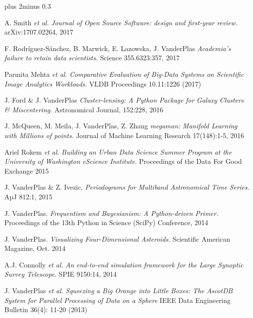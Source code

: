 \documentclass{article} %
\def\bf{\bfseries}
\def\sf{\sffamily}
\newlength\sidebarwidth
\newcommand{\smalltopic}[2]%
	 {\pagebreak[2]%
	 \vskip 1\baselineskip plus 2\baselineskip minus 0.3\baselineskip
	 \begin{minipage}{\textwidth}
         \phantomsection\addcontentsline{toc}{subsection}{#1}%
         \nopagebreak\hspace{0in}%
         \nopagebreak\begin{minipage}[t]{\sidebarwidth - .2cm}
         \raggedleft \bf\sf %
	 \textcolor{dark_blue}{\large #1}%
	 \end{minipage}%
	 \hfill
	 \begin{minipage}[t]{\linewidth - \sidebarwidth}
	 \nopagebreak{%
	    \rule{\linewidth}{.5pt}%
	    \vspace{.1\baselineskip}%
	    }%
	    #2
	 \end{minipage}
	 \end{minipage}}
\begin{document}
\smalltopic{}{

  \begin{itemize}[leftmargin=0ex, itemsep=0ex, parsep=.5ex, labelindent=-4ex]

    \publication
          A. Smith {\it et al.}
          {\it Journal of Open Source Software: design and first-year review.}
          arXiv:1707.02264, 2017
          
    \publication
          F. Rodríguez-Sánchez, B. Marwick, E. Lazowska, J. VanderPlas
          {\it Academia's failure to retain data scientists.}
          Science 355.6323:357, 2017

    \publication
          Parmita Mehta {\it et al.}
          {\it Comparative Evaluation of Big-Data Systems on Scientific Image Analytics Workloads.}
          VLDB Proceedings 10.11:1226 (2017)

    \publication
	  J. Ford \& J. VanderPlas
	  {\it Cluster-lensing: A Python Package for Galaxy Clusters \& Miscentering.}
	  Astronomical Journal, 152:228, 2016

    \publication
      J. McQueen, M. Meila, J. VanderPlas, Z. Zhang
      {\it megaman: Manifold Learning with Millions of points.}
      Journal of Machine Learning Research 17(148):1-5, 2016

    \publication
      Ariel Rokem {\it et al.}
      {\it Building an Urban Data Science Summer Program at the University of Washington eScience Institute}.
      Proceedings of the Data For Good Exchange 2015

    \publication
      J. VanderPlas \& Z. Ivezic.
      {\it Periodograms for Multiband Astronomical Time Series.}
      ApJ 812:1, 2015

    \publication
      J. VanderPlas.
      {\it Frequentism and Bayesianism: A Python-driven Primer.}
      Proceedings of the 13th Python in Science (SciPy) Conference, 2014

    \publication
      J. VanderPlas.
      {\it Visualizing Four-Dimensional Asteroids.}
      Scientific American Magazine, Oct. 2014

    \publication
      A.J. Connolly {\it et al.}
      {\it An end-to-end simulation framework for the Large Synoptic Survey Telescope.}
      SPIE 9150:14, 2014

    \publication
      J. VanderPlas {\it et al.}
      {\it Squeezing a Big Orange into Little Boxes: The AscotDB System
        for Parallel Processing of Data on a Sphere}
      IEEE Data Engineering Bulletin 36(4): 11-20 (2013)


\end{itemize}}
\end{document}
